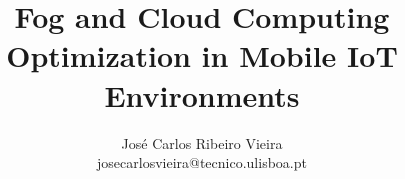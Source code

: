\documentclass{llncs}
\begin{document}
\mainmatter              %
\title{Fog and Cloud Computing Optimization in Mobile IoT Environments}
\author{
	José Carlos Ribeiro Vieira\\
	josecarlosvieira@tecnico.ulisboa.pt \\
}


{\def\addcontentsline#1#2#3{}\maketitle} %

\begin{abstract}

\end{abstract}

\setcounter{tocdepth}{2} 
\tableofcontents

\vfill
\pagebreak










\end{document}
